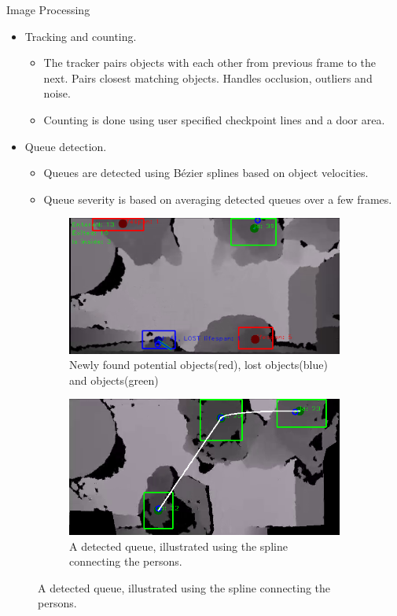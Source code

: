 \documentclass[final,hyperref={pdfpagelabels=false}]{beamer}
\begin{document}
\begin{frame}[t]
\begin{columns}[t]
\begin{column}{.465\textwidth}
\begin{block}{Image Processing}
\begin{itemize}
	\item Tracking and counting.
	\begin{itemize}
		\item{The tracker pairs objects with each other from previous frame to the next. Pairs closest matching objects. Handles occlusion, outliers and noise.}
		\item{Counting is done using user specified checkpoint lines and a door area.}
	\end{itemize}
	
	\item Queue detection.
	\begin{itemize}
		\item Queues are detected using Bézier splines based on object velocities.
		\item Queue severity is based on averaging detected queues over a few frames.
	\end{itemize}
\end{itemize}

\begin{figure}
\begin{subfigure}{.5\textwidth}
\centering
\includegraphics[width=0.9\linewidth]{trackingExample.png}
\caption{\centering Newly found potential objects(red), lost 
		 objects(blue) and objects(green)}
\end{subfigure}%
\begin{subfigure}{.5\textwidth}
\centering
\includegraphics[width=0.9\linewidth]{visibleQueue.png}
\caption{\centering A detected queue, illustrated using the spline connecting the persons.}
\end{subfigure}
\end{figure}


\end{block}
\end{column}
\end{columns}
\end{frame}
\end{document}
